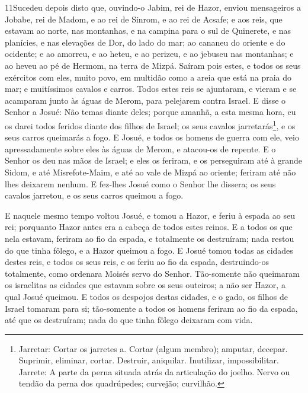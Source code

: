 \lettrine{11} Sucedeu depois disto que, ouvindo-o Jabim, rei
de Hazor, enviou mensageiros a Jobabe, rei de Madom, e ao rei de
Sinrom, e ao rei de Acsafe; e aos reis, que estavam ao norte,
nas montanhas, e na campina para o sul de Quinerete, e nas
planícies, e nas elevações de Dor, do lado do mar; ao cananeu do
oriente e do ocidente; e ao amorreu, e ao heteu, e ao perizeu, e ao
jebuseu nas montanhas; e ao heveu ao pé de Hermom, na terra de
Mizpá. Saíram pois estes, e todos os seus exércitos com eles,
muito povo, em multidão como a areia que está na praia do mar; e
muitíssimos cavalos e carros. Todos estes reis se ajuntaram, e
vieram e se acamparam junto às águas de Merom, para pelejarem contra
Israel. E disse o Senhor a Josué: Não temas diante deles; porque
amanhã, a esta mesma hora, eu os darei todos feridos diante dos
filhos de Israel; os seus cavalos jarretarás\footnote{Jarretar:
Cortar os jarretes a. Cortar (algum membro); amputar, decepar.
Suprimir, eliminar, cortar. Destruir, aniquilar. Inutilizar,
impossibilitar. Jarrete: A parte da perna situada atrás da
articulação do joelho. Nervo ou tendão da perna dos quadrúpedes;
curvejão; curvilhão.}, e os seus carros queimarás a fogo. E
Josué, e todos os homens de guerra com ele, veio apressadamente
sobre eles às águas de Merom, e atacou-os de repente. E o Senhor
os deu nas mãos de Israel; e eles os feriram, e os perseguiram até à
grande Sidom, e até Misrefote-Maim, e até ao vale de Mizpá ao
oriente; feriram até não lhes deixarem nenhum. E fez-lhes Josué
como o Senhor lhe dissera; os seus cavalos jarretou, e os seus
carros queimou a fogo.

E naquele mesmo tempo voltou Josué, e tomou a Hazor, e feriu à
espada ao seu rei; porquanto Hazor antes era a cabeça de todos estes
reinos. E a todos os que nela estavam, feriram ao fio da
espada, e totalmente os destruíram; nada restou do que tinha fôlego,
e a Hazor queimou a fogo. E Josué tomou todas as cidades
destes reis, e todos os seus reis, e os feriu ao fio da espada,
destruindo-os totalmente, como ordenara Moisés servo do Senhor.
Tão-somente não queimaram os israelitas as cidades que
estavam sobre os seus outeiros; a não ser Hazor, a qual Josué
queimou. E todos os despojos destas cidades, e o gado, os
filhos de Israel tomaram para si; tão-somente a todos os homens
feriram ao fio da espada, até que os destruíram; nada do que tinha
fôlego deixaram com vida.


